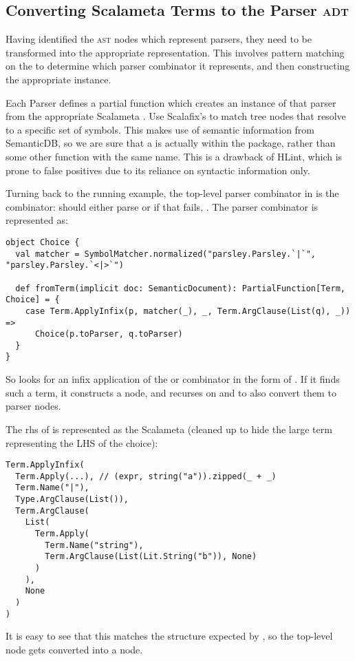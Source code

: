 \documentclass[../../main.tex]{subfiles}
\begin{document}
\subsection{Converting Scalameta Terms to the Parser \textsc{adt}}
Having identified the \textsc{ast} nodes which represent parsers, they need to be transformed into the appropriate  representation.
This involves pattern matching on the  to determine which parser combinator it represents, and then constructing the appropriate  instance.

Each Parser defines a partial function  which creates an instance of that parser from the appropriate Scalameta .
Use Scalafix's  to match tree nodes that resolve to a specific set of symbols.
This makes use of semantic information from SemanticDB, so we are sure that a \scala{<*>} is actually within the  package, rather than some other function with the same name.
This is a drawback of HLint, which is prone to false positives due to its reliance on syntactic information only.

Turning back to the running example, the top-level parser combinator in  is the  combinator:
 should either parse  or if that fails, .
The  parser combinator is represented as:
\begin{verbatim}
object Choice {
  val matcher = SymbolMatcher.normalized("parsley.Parsley.`|`", "parsley.Parsley.`<|>`")

  def fromTerm(implicit doc: SemanticDocument): PartialFunction[Term, Choice] = {
    case Term.ApplyInfix(p, matcher(_), _, Term.ArgClause(List(q), _)) =>
      Choice(p.toParser, q.toParser)
  }
}
\end{verbatim}
So  looks for an infix application of the \scala{|} or \scala{<|>} combinator in the form of .
If it finds such a term, it constructs a  node, and recurses on  and  to also convert them to parser nodes.

The rhs of  is represented as the Scalameta  (cleaned up to hide the large term representing the LHS of the choice):
\begin{verbatim}
Term.ApplyInfix(
  Term.Apply(...), // (expr, string("a")).zipped(_ + _)
  Term.Name("|"),
  Type.ArgClause(List()),
  Term.ArgClause(
    List(
      Term.Apply(
        Term.Name("string"),
        Term.ArgClause(List(Lit.String("b")), None)
      )
    ),
    None
  )
)
\end{verbatim}
It is easy to see that this matches the structure expected by , so the top-level node gets converted into a  node.
\end{document}
